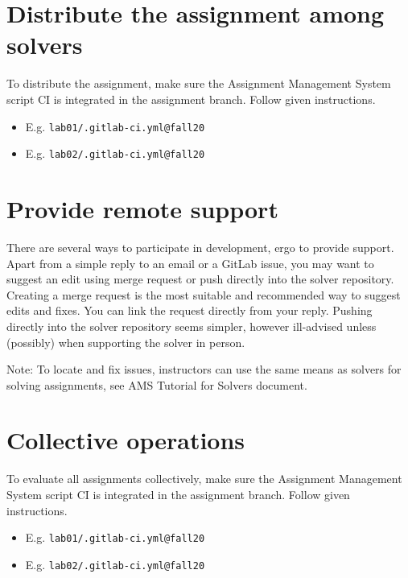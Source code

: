 \section{Distribute the assignment among solvers} \label{ssec:distributeassn}

{To distribute the assignment, make sure the Assignment Management System script CI is integrated in the assignment branch. Follow given instructions.}

\begin{itemize}
\item
  {E.g. \texttt{lab01/.gitlab-ci.yml@fall20}}
\item
  {E.g. \texttt{lab02/.gitlab-ci.yml@fall20}}
\end{itemize}

\section{Provide remote support} \label{ssec:providesup}

{There are several ways to participate in development, ergo to provide support. Apart from a simple reply to an email or a GitLab issue, you may want to suggest an edit using merge request or push directly into the solver repository.}
{Creating a merge request is the most suitable and recommended way to suggest edits and fixes. You can link the request directly from your reply. Pushing directly into the solver repository seems simpler, however ill-advised unless (possibly) when supporting the solver in person.}

{Note: To locate and fix issues, instructors can use the same means as solvers for solving assignments, see AMS Tutorial for Solvers document.}

\section{Collective operations} \label{ssec:collop}

{To evaluate all assignments collectively, make sure the Assignment Management System script CI is integrated in the assignment branch. Follow given instructions.}

\begin{itemize}
\item
  {E.g. \texttt{lab01/.gitlab-ci.yml@fall20}}
\item
  {E.g. \texttt{lab02/.gitlab-ci.yml@fall20}}
\end{itemize}

